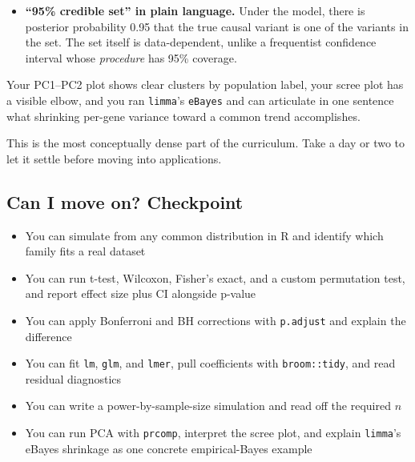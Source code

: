 \begin{itemize}[nosep]
\begin{lstlisting}
topTable(fitB, coef = 2, number = 10)
    \end{lstlisting}
    \texttt{eBayes} borrows strength across genes: genes with few observations get their variance pulled toward the global trend, which stabilizes tiny denominators and reduces false positives. Compare the moderated t-statistic \texttt{fitB\$t} to the ordinary t \texttt{fit\$coefficients / fit\$stdev.unscaled}. Same idea appears in DESeq2's dispersion shrinkage and in SuSiE's credible sets.
  \item \textbf{``95\% credible set'' in plain language.} Under the model, there is posterior probability 0.95 that the true causal variant is one of the variants in the set. The set itself is data-dependent, unlike a frequentist confidence interval whose \textit{procedure} has 95\% coverage.
\end{itemize}
\begin{winbox}[Checkpoint]
Your PC1--PC2 plot shows clear clusters by population label, your scree plot has a visible elbow, and you ran \texttt{limma}'s \texttt{eBayes} and can articulate in one sentence what shrinking per-gene variance toward a common trend accomplishes.
\end{winbox}

\begin{restbox}
This is the most conceptually dense part of the curriculum. Take a day or two to let it settle before moving into applications.
\end{restbox}

\subsection{Can I move on? Checkpoint}
\begin{itemize}[nosep]
  \item You can simulate from any common distribution in R and identify which family fits a real dataset
  \item You can run t-test, Wilcoxon, Fisher's exact, and a custom permutation test, and report effect size plus CI alongside p-value
  \item You can apply Bonferroni and BH corrections with \texttt{p.adjust} and explain the difference
  \item You can fit \texttt{lm}, \texttt{glm}, and \texttt{lmer}, pull coefficients with \texttt{broom::tidy}, and read residual diagnostics
  \item You can write a power-by-sample-size simulation and read off the required $n$
  \item You can run PCA with \texttt{prcomp}, interpret the scree plot, and explain \texttt{limma}'s eBayes shrinkage as one concrete empirical-Bayes example
\end{itemize}

